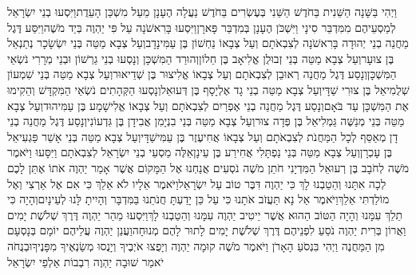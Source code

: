 \documentclass[../main/main.tex]{subfiles}
\begin{document}
\begin{multicols}{\ncols}
וַיְהִי בַּשָּׁנָה הַשֵּׁנִית בַּחֹדֶשׁ הַשֵּׁנִי בְּעֶשְׂרִים בַּחֹדֶשׁ נַעֲלָה הֶעָנָן מֵעַל מִשְׁכַּן הָעֵדֻת\PreVerseSpace{}וַיִּסְעוּ בְנֵי יִשְׂרָאֵל לְמַסְעֵיהֶם מִמִּדְבַּר סִינָי וַיִּשְׁכֹּן הֶעָנָן בְּמִדְבַּר פָּארָן\PreVerseSpace{}וַיִּסְעוּ בָּרִאשֹׁנָה עַל פִּי יַהְוֶה בְּיַד מֹשֶׁה\PreVerseSpace{}וַיִּסַּע דֶּגֶל מַחֲנֵה בְנֵי יְהוּדָה בָּרִאשֹׁנָה לְצִבְאֹתָם וְעַל צְבָאוֹ נַחְשׁוֹן בֶּן עַמִּינָדָב\PreVerseSpace{}וְעַל צְבָא מַטֵּה בְּנֵי יִשְׂשָׂכָר נְתַנְאֵל בֶּן צוּעָר\PreVerseSpace{}וְעַל צְבָא מַטֵּה בְּנֵי זְבוּלֻן אֱלִיאָב בֶּן חֵלוֹן\PreVerseSpace{}וְהוּרַד הַמִּשְׁכָּן וְנָסְעוּ בְנֵי גֵרְשׁוֹן וּבְנֵי מְרָרִי נֹשְׂאֵי הַמִּשְׁכָּן\PreVerseSpace{}וְנָסַע דֶּגֶל מַחֲנֵה רְאוּבֵן לְצִבְאֹתָם וְעַל צְבָאוֹ אֱלִיצוּר בֶּן שְׁדֵיאוּר\PreVerseSpace{}וְעַל צְבָא מַטֵּה בְּנֵי שִׁמְעוֹן שְׁלֻמִיאֵל בֶּן צוּרִי שַׁדָּי\PreVerseSpace{}וְעַל צְבָא מַטֵּה בְנֵי גָד אֶלְיָסָף בֶּן דְּעוּאֵל\PreVerseSpace{}וְנָסְעוּ הַקְּהָתִים נֹשְׂאֵי הַמִּקְדָּשׁ וְהֵקִימוּ אֶת הַמִּשְׁכָּן עַד בֹּאָם\PreVerseSpace{}וְנָסַע דֶּגֶל מַחֲנֵה בְנֵי אֶפְרַיִם לְצִבְאֹתָם וְעַל צְבָאוֹ אֱלִישָׁמָע בֶּן עַמִּיהוּד\PreVerseSpace{}וְעַל צְבָא מַטֵּה בְּנֵי מְנַשֶּׁה גַּמְלִיאֵל בֶּן פְּדָה צוּר\PreVerseSpace{}וְעַל צְבָא מַטֵּה בְּנֵי בִנְיָמִן אֲבִידָן בֶּן גִּדְעוֹנִי\PreVerseSpace{}וְנָסַע דֶּגֶל מַחֲנֵה בְנֵי דָן מְאַסֵּף לְכָל הַמַּחֲנֹת לְצִבְאֹתָם וְעַל צְבָאוֹ אֲחִיעֶזֶר בֶּן עַמִּישַׁדָּי\PreVerseSpace{}וְעַל צְבָא מַטֵּה בְּנֵי אָשֵׁר פַּגְעִיאֵל בֶּן עָכְרָן\PreVerseSpace{}וְעַל צְבָא מַטֵּה בְּנֵי נַפְתָּלִי אֲחִירַע בֶּן עֵינָן\PreVerseSpace{}אֵלֶּה מַסְעֵי בְנֵי יִשְׂרָאֵל לְצִבְאֹתָם וַיִּסָּעוּ \ClosedSection{}וַיֹּאמֶר מֹשֶׁה לְחֹבָב בֶּן רְעוּאֵל הַמִּדְיָנִי חֹתֵן מֹשֶׁה נֹסְעִים אֲנַחְנוּ אֶל הַמָּקוֹם אֲשֶׁר אָמַר יַהְוֶה אֹתוֹ אֶתֵּן לָכֶם לְכָה אִתָּנוּ וְהֵטַבְנוּ לָךְ כִּי יַהְוֶה דִּבֶּר טוֹב עַל יִשְׂרָאֵל\PreVerseSpace{}וַיֹּאמֶר אֵלָיו לֹא אֵלֵךְ כִּי אִם אֶל אַרְצִי וְאֶל מוֹלַדְתִּי אֵלֵךְ\PreVerseSpace{}וַיֹּאמֶר אַל נָא תַּעֲזֹב אֹתָנוּ כִּי עַל כֵּן יָדַעְתָּ חֲנֹתֵנוּ בַּמִּדְבָּר וְהָיִיתָ לָּנוּ לְעֵינָיִם\PreVerseSpace{}וְהָיָה כִּי תֵלֵךְ עִמָּנוּ וְהָיָה הַטּוֹב הַהוּא אֲשֶׁר יֵיטִיב יַהְוֶה עִמָּנוּ וְהֵטַבְנוּ לָךְ\PreVerseSpace{}וַיִּסְעוּ מֵהַר יַהְוֶה דֶּרֶךְ שְׁלֹשֶׁת יָמִים וַאֲרוֹן בְּרִית יַהְוֶה נֹסֵעַ לִפְנֵיהֶם דֶּרֶךְ שְׁלֹשֶׁת יָמִים לָתוּר לָהֶם מְנוּחָה\PreVerseSpace{}וַעֲנַן יַהְוֶה עֲלֵיהֶם יוֹמָם בְּנָסְעָם מִן הַמַּחֲנֶה \ClosedSection{}וַיְהִי בִּנְסֹעַ הָאָרֹן וַיֹּאמֶר מֹשֶׁה קוּמָה יַהְוֶה וְיָפֻצוּ אֹיְבֶיךָ וְיָנֻסוּ מְשַׂנְאֶיךָ מִפָּנֶיךָ\PreVerseSpace{}וּבְנֻחֹה יֹאמַר שׁוּבָה יַהְוֶה רִבְבוֹת אַלְפֵי יִשְׂרָאֵל\OpenSection{}\par

\end{multicols}
\end{document}
